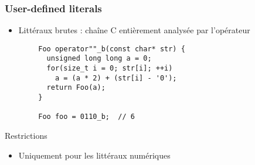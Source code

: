 \documentclass[C++.tex]{subfiles}
\begin{document}
\begin{frame}[fragile]
	\frametitle{User-defined literals}
	\begin{itemize}
		\item Littéraux brutes : chaîne C entièrement analysée par l'opérateur
	\end{itemize}
	
	\begin{verbatim}
		Foo operator""_b(const char* str) {
		  unsigned long long a = 0;
		  for(size_t i = 0; str[i]; ++i)
		    a = (a * 2) + (str[i] - '0');
		  return Foo(a);
		}

		Foo foo = 0110_b;  // 6
	\end{verbatim}

	\begin{alertblock}{Restrictions}
		\begin{itemize}
			\item Uniquement pour les littéraux numériques
		\end{itemize}
	\end{alertblock}
\end{frame}
\end{document}
